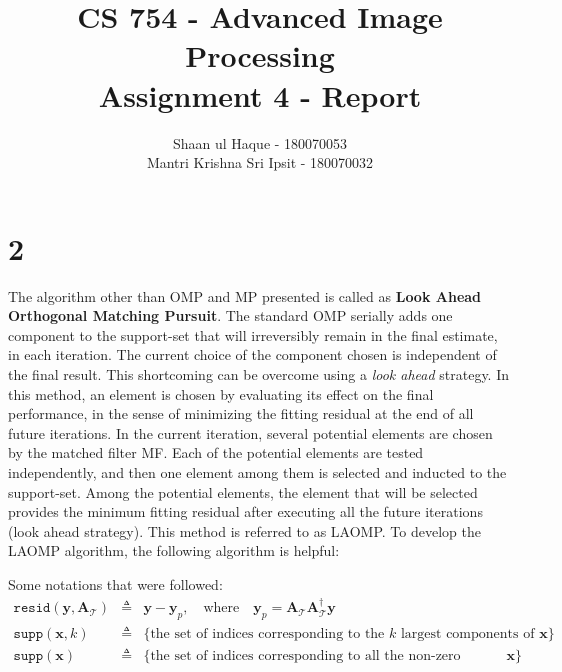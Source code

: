 \documentclass[12pt]{article}
\title{CS 754 - Advanced Image Processing\\Assignment 4 - Report}
\author{Shaan ul Haque - 180070053\\Mantri Krishna Sri Ipsit - 180070032}
\begin{document}
	
	\maketitle
	\section*{2}
	The algorithm other than OMP and MP presented is called as \textbf{Look Ahead Orthogonal Matching Pursuit}. The standard OMP serially adds one component to the support-set that will irreversibly remain in the final estimate, in each iteration. The current choice of the component chosen is independent of the final result. This shortcoming can be overcome using a \textit{look ahead} strategy. In this method, an element is chosen by evaluating its effect on the final performance, in the sense of minimizing the fitting residual at the end of all future iterations. In the current iteration, several potential elements are chosen by the matched filter MF. Each of the potential elements are tested independently, and then one element among them is selected and inducted to the support-set. Among the potential elements, the element that will be selected provides the minimum fitting residual after executing all the future iterations (look ahead strategy). This method is referred to as LAOMP. To develop the LAOMP algorithm, the following algorithm is helpful:
	
	Some notations that were followed:
\begin{eqnarray*}
\texttt{resid}(\boldsymbol{y}, \boldsymbol{A}_{\mathcal{T}}) &\triangleq& \boldsymbol{y} - \boldsymbol{y}_p, \quad \text{where} \quad \boldsymbol{y}_p = \boldsymbol{A}_\mathcal{T}\boldsymbol{A}_\mathcal{T}^\dagger\boldsymbol{y}\\
\texttt{supp}(\boldsymbol{x}, k) &\triangleq& \text{\{the set of indices corresponding to the $k$ largest components of $\boldsymbol{x}$\}}\\
\texttt{supp}(\boldsymbol{x}) &\triangleq& \text{\{the set of indices corresponding to all the non-zero components of $\boldsymbol{x}$\}}
\end{eqnarray*}
	
\end{document}
